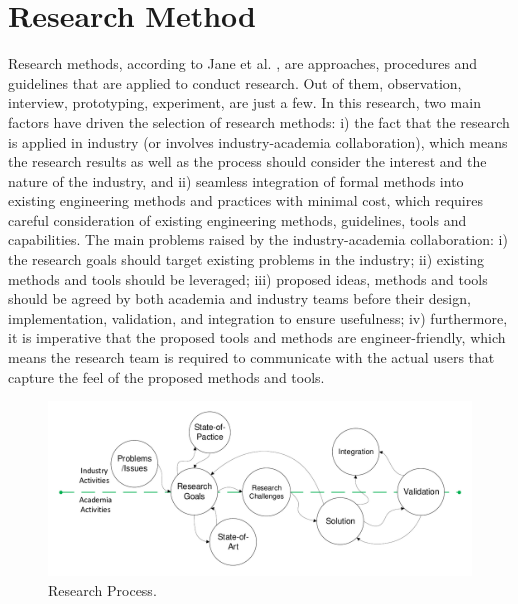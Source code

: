 \chapter{Research Method}
\label{methods}
Research methods, according to Jane et al. \cite{qualitateiveresearch2012}, are approaches, procedures and guidelines that are applied to conduct research. Out of them, observation, interview, prototyping, experiment, are just a few. In this research, two main factors have driven the selection of research methods: i) the fact that the research is applied in industry (or involves industry-academia collaboration), which means the research results as well as the process should consider the interest and the nature of the industry, and ii) seamless integration of formal methods into existing engineering methods and practices with minimal cost, which requires careful consideration of existing engineering methods, guidelines, tools and capabilities. The main problems raised by the industry-academia collaboration: i) the research goals should target existing problems in the industry; ii) existing methods and tools should be leveraged; iii) proposed ideas, methods and tools should be agreed by both academia and industry teams before their design, implementation, validation, and integration to ensure usefulness; iv) furthermore, it is imperative that the proposed tools and methods are engineer-friendly, which means the research team is required to communicate with the actual users that capture the feel of the proposed methods and tools. 
\begin{figure}[h]
	\centering
	\includegraphics[trim=10 0 10 0, clip,width=1\linewidth]{images/research_process.pdf}
	\caption{Research Process.}
	\label{fig_research_process}
\end{figure}

